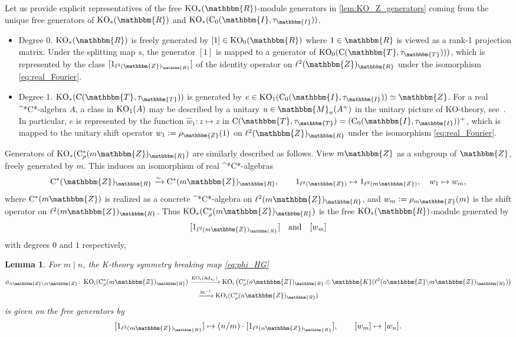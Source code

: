 \documentclass{amsart}
\numberwithin{figure}{section}
\numberwithin{equation}{section}
\numberwithin{table}{section}
\theoremstyle{plain}
\newtheorem{lemma}[equation]{Lemma}
\theoremstyle{definition}
\theoremstyle{remark}
\theoremstyle{nonumber}
\newcommand{\Z}{\mathbb{Z}}
\newcommand{\R}{\mathbb{R}}
\newcommand{\T}{\mathbb{T}}
\newcommand{\Mat}{\mathbb{M}}
\newcommand{\Cpt}{\mathbb{K}}
\newcommand{\I}{\mathbb{I}} %
\newcommand{\K}{\relax\ifmmode\operatorname{K}\else\textup{K}\fi}
\newcommand{\KO}{\relax\ifmmode\operatorname{KO}\else\textup{KO}\fi}
\newcommand{\Cst}{\relax\ifmmode\mathrm{C}^*\else\textup{C*}\fi}
\newcommand{\Cont}{\mathrm{C}}
\newcommand{\Co}{\mathrm{C}_0}
\newcommand{\Cstr}{\Cst_\rho} %
\newcommand{\Ad}{\operatorname{Ad}} %
\newcommand{\defeq}{\mathrel{\vcentcolon=}}
\renewcommand{\mathbb}{\mathbbm} %
\begin{document}
Let us provide explicit representatives of the free \( \KO_*(\R) \)-module
generators in \cref{lem:KO_Z_generators} coming from 
the unique free generators of \( \KO_*(\R) \) and \(
\KO_*(\Co(\mathbb{I},\tau_{\mathbb{I}})) \).

\begin{itemize}
\item Degree 0. $\KO_*(\R)$ is freely generated by $[1]\in
\KO_0(\R)$ where \(1\in\R\) is viewed as a rank-1 projection matrix. 
Under the splitting map $s$, the generator $[1]$ is mapped to a 
generator of \( \KO_0(\Cont(\T, \tau_\T))) \), which is 
represented by the
class $[1_{\ell^2(\Z)_\R}]$ of the identity operator on \( \ell^2(\Z)_\R
\) under the isomorphism \eqref{eq:real_Fourier}.

\item Degree 1. $\KO_*(\Cont(\T,\tau_\T))$ is generated by \( e
\in \KO_1(\Co(\I,\tau_\I))\simeq\Z \). For a real
\Cst-algebra \( A \), a class in \( \KO_1(A) \) may be described by a
unitary \( u\in\Mat_n(A^+) \) in the unitary picture of KO-theory,
see~\cite{Boersema-Loring:K-theory_unitaries}. In particular, $e$ is
represented by the function $\widehat{w}_1\colon z\mapsto z$ in
$\Cont(\T,\tau_\T)=(\Co(\I,\tau_\I))^+$, which is mapped to
the unitary shift operator $w_1\defeq\rho_\Z(1)$ 
on \( \ell^2(\Z)_\R \) under the isomorphism \eqref{eq:real_Fourier}.
\end{itemize}

Generators of \( \KO_*(\Cstr(m\Z)_\R) \) are similarly described as
follows. View \( m\Z \) as a subgroup of \( \Z \), freely generated
by \( m \). This induces an isomorphism of real \Cst-algebras 
\[
\Cst(\Z)_\R\xrightarrow{\sim}\Cst(m\Z)_\R, \qquad
1_{\ell^2(\Z)}\mapsto 1_{\ell^2(m\Z)}, \quad w_1 \mapsto w_m, 
\]
where \( \Cst(m\Z) \) is realized as a concrete \Cst-algebra on \(
\ell^2(m\Z)_{\R} \), and \( w_m\defeq \rho_{m\Z}(m) \) is the shift
operator on
\( \ell^2(m\Z)_\R \). Thus \( \KO_*(\Cstr(m\Z)_\R) \) is the free \(
\KO_*(\R) \)-module generated by
\begin{equation}\label{eq:real_1D_KO_generators}
[1_{\ell^2(m\Z)_\R}]\quad\text{and}\quad [w_m] 
\end{equation} 
with degrees $0$ and $1$ respectively,

\begin{lemma}\label{lem:SB_map_1-dim}
For \( m\mid n \), the \K-theory symmetry breaking map \eqref{eq:phi_HG}
\begin{multline*}
\phi_{n\Z\backslash m\Z}\colon \KO_i(\Cstr(m\Z)_\R)
\xrightarrow{\KO_i(\Ad_{\eta_s})}
\KO_i\big(\Cstr(n\Z)_\R\otimes\Cpt(\ell^2(n\Z\backslash m\Z)_\R)\big)\\
\xrightarrow{\mathrm{St}^{-1}} 
\KO_i(\Cstr(n\Z)_\R)
\end{multline*}
is given on the free generators by
\begin{equation}\label{eq:KO.symm.breaking.d1}
[1_{\ell^2(m\Z)_\R}]\mapsto (n/m)\cdot[1_{\ell^2(n\Z)_\R}],
\qquad [w_m]\mapsto [w_n].
\end{equation}
\end{lemma}
\end{document}
